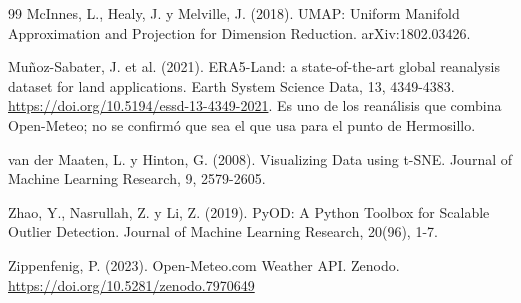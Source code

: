 \documentclass[11pt]{article}
\begin{document}
\begin{thebibliography}{99}
McInnes, L., Healy, J. y Melville, J. (2018). UMAP: Uniform Manifold Approximation and Projection for Dimension Reduction. arXiv:1802.03426.

Muñoz-Sabater, J. et al. (2021). ERA5-Land: a state-of-the-art global reanalysis dataset for land applications. Earth System Science Data, 13, 4349-4383. \url{https://doi.org/10.5194/essd-13-4349-2021}. Es uno de los reanálisis que combina Open-Meteo; no se confirmó que sea el que usa para el punto de Hermosillo.

van der Maaten, L. y Hinton, G. (2008). Visualizing Data using t-SNE. Journal of Machine Learning Research, 9, 2579-2605.

Zhao, Y., Nasrullah, Z. y Li, Z. (2019). PyOD: A Python Toolbox for Scalable Outlier Detection. Journal of Machine Learning Research, 20(96), 1-7.

Zippenfenig, P. (2023). Open-Meteo.com Weather API. Zenodo. \url{https://doi.org/10.5281/zenodo.7970649}

\end{thebibliography}
\end{document}
